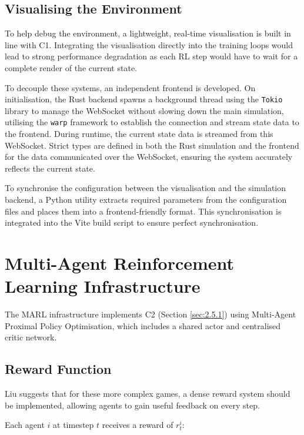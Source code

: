 \subsection{Visualising the Environment}
\label{sec:3.2.5}

To help debug the environment, a lightweight, real-time visualisation is built in line with C1.
Integrating the visualisation directly into the training loops would lead to strong performance degradation as each RL step would have to wait for a complete render of the current state.

To decouple these systems, an independent frontend is developed.
On initialisation, the Rust backend spawns a background thread using the \lstinline[language=Rust]|Tokio| library \cite{tokio} to manage the WebSocket without slowing down the main simulation, utilising the \lstinline[language=Rust]|warp| framework \cite{warp} to establish the connection and stream state data to the frontend.
During runtime, the current state data is streamed from this WebSocket.
Strict types are defined in both the Rust simulation and the frontend for the data communicated over the WebSocket, ensuring the system accurately reflects the current state.

To synchronise the configuration between the visualisation and the simulation backend, a Python utility extracts required parameters from the configuration files and places them into a frontend-friendly format.
This synchronisation is integrated into the Vite \cite{vite} build script to ensure perfect synchronisation.

\section{Multi-Agent Reinforcement Learning Infrastructure}
\label{sec:3.3}

The MARL infrastructure implements C2 (Section \ref{sec:2.5.1}) using Multi-Agent Proximal Policy Optimisation, which includes a shared actor and centralised critic network.


\subsection{Reward Function}
\label{sec:3.3.1}
Liu suggests that for these more complex games, a dense reward system should be implemented, allowing agents to gain useful feedback on every step.

Each agent $i$ at timestep $t$ receives a reward of $r_t^i$:

